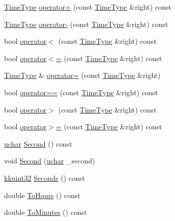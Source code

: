 \begin{DoxyCompactItemize}
\item 
\hyperlink{class_k_k_b_1_1_time_type}{Time\+Type} \hyperlink{class_k_k_b_1_1_time_type_a4a0b4823dd8ae0a03906725ea1085fd6}{operator+} (const \hyperlink{class_k_k_b_1_1_time_type}{Time\+Type} \&right) const 
\item 
\hyperlink{class_k_k_b_1_1_time_type}{Time\+Type} \hyperlink{class_k_k_b_1_1_time_type_a08751a2f2ff098ddec10c2548a06f04d}{operator-\/} (const \hyperlink{class_k_k_b_1_1_time_type}{Time\+Type} \&right) const 
\item 
bool \hyperlink{class_k_k_b_1_1_time_type_a02230c88b0111b6cc84196328657d10c}{operator$<$} (const \hyperlink{class_k_k_b_1_1_time_type}{Time\+Type} \&right) const 
\item 
bool \hyperlink{class_k_k_b_1_1_time_type_adfbd6a4380d501d4fbe07cd985814c9b}{operator$<$=} (const \hyperlink{class_k_k_b_1_1_time_type}{Time\+Type} \&right) const 
\item 
\hyperlink{class_k_k_b_1_1_time_type}{Time\+Type} \& \hyperlink{class_k_k_b_1_1_time_type_a6c31d8b68d69b640c25f1c801c20effb}{operator=} (const \hyperlink{class_k_k_b_1_1_time_type}{Time\+Type} \&right)
\item 
bool \hyperlink{class_k_k_b_1_1_time_type_a41848292cdd7b27ea12b1be66bc84bdc}{operator==} (const \hyperlink{class_k_k_b_1_1_time_type}{Time\+Type} \&right) const 
\item 
bool \hyperlink{class_k_k_b_1_1_time_type_a76edd906d5cc3a8592a9883aee9b5031}{operator$>$} (const \hyperlink{class_k_k_b_1_1_time_type}{Time\+Type} \&right) const 
\item 
bool \hyperlink{class_k_k_b_1_1_time_type_a1dd2f9622fbd9779d1c8fccaebd9b94f}{operator$>$=} (const \hyperlink{class_k_k_b_1_1_time_type}{Time\+Type} \&right) const 
\item 
\hyperlink{namespace_k_k_b_ace9969169bf514f9ee6185186949cdf7}{uchar} \hyperlink{class_k_k_b_1_1_time_type_a628fd6ea76c67b34b425a1d8a6634b63}{Second} () const 
\item 
void \hyperlink{class_k_k_b_1_1_time_type_a221264f93619205b4fe9596bc6a53aa7}{Second} (\hyperlink{namespace_k_k_b_ace9969169bf514f9ee6185186949cdf7}{uchar} \+\_\+second)
\item 
\hyperlink{namespace_k_k_b_af8d832f05c54994a1cce25bd5743e19a}{kkuint32} \hyperlink{class_k_k_b_1_1_time_type_af80ec040b96f4ec8e2dcd91bd59f76b9}{Seconds} () const 
\item 
double \hyperlink{class_k_k_b_1_1_time_type_a21bf8aacbff337b3f95457eeeb1fc9be}{To\+Hours} () const 
\item 
double \hyperlink{class_k_k_b_1_1_time_type_acd534661c59d874815d981e5a86eb88e}{To\+Minutes} () const 
\end{DoxyCompactItemize}
